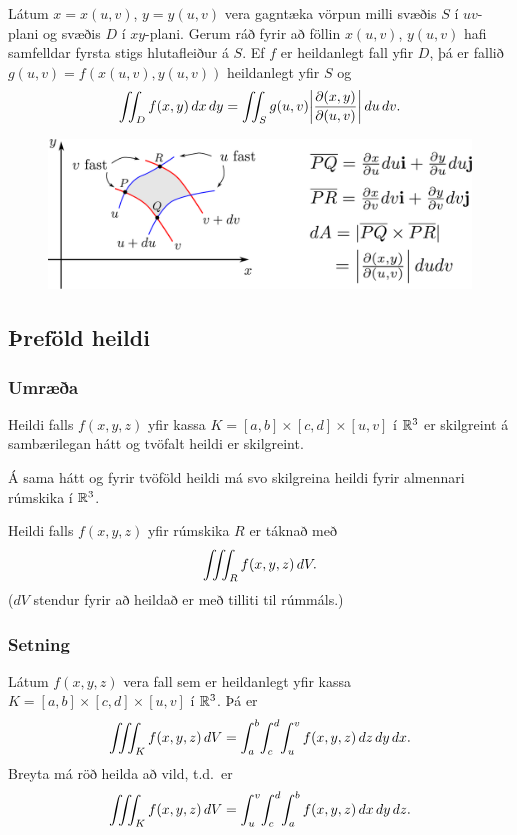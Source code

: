 Látum $x=x(u,v)$, $y=y(u,v)$ vera gagntæka vörpun milli svæðis $S$ í
$uv$-plani og svæðis $D$ í $xy$-plani.  Gerum ráð fyrir að föllin  
$x(u,v)$, $y(u,v)$ hafi samfelldar fyrsta stigs hlutafleiður á $S$.  Ef
$f$ er heildanlegt fall yfir $D$, þá er fallið $g(u,v)=f(x(u,v), y(u,v))$
heildanlegt yfir $S$ og 
$$\int\!\!\!\int_D f(x,y)\,dx\,dy=\int\!\!\!\int_S g(u,v)
\bigg|\frac{\partial(x,y)}{\partial(u,v)}\bigg|\,du\,dv.$$

\begin {figure}[h!]
 \centering
            \includegraphics[width=0.85\linewidth]{changevar}
	\caption*{}
\end {figure}




\subsection{Þreföld heildi} 

\subsubsection{Umræða }
Heildi falls $f(x,y,z)$ yfir kassa $K=[a,b]\times[c,d]\times[u,v]$ í ${\mathbb R}^3$ er skilgreint á sambærilegan hátt og  tvöfalt heildi er skilgreint.  

\medskip
Á sama hátt og fyrir tvöföld heildi má svo skilgreina heildi fyrir almennari rúmskika í ${\mathbb R}^3$. 

\medskip
Heildi falls $f(x,y,z)$ yfir rúmskika $R$ er táknað með 
$$\int\!\!\!\int\!\!\!\int_R f(x,y,z)\,dV.$$
($dV$ stendur fyrir að heildað er með tilliti til rúmmáls.)



\subsubsection{Setning }
 Látum $f(x,y,z)$ vera fall sem er heildanlegt yfir kassa $K=[a,b]\times[c,d]\times[u,v]$ í ${\mathbb R}^3$.  Þá er
$$\thrint_K f(x,y,z)\,dV=
\int_a^b\!\int_c^d\!\int_u^v f(x,y,z)\,dz\,dy\,dx.$$ 
Breyta má röð heilda að vild, t.d.\ er 
$$\thrint_K f(x,y,z)\,dV=
\int_u^v\!\int_c^d\!\int_a^b f(x,y,z)\,dx\,dy\,dz.$$ 


